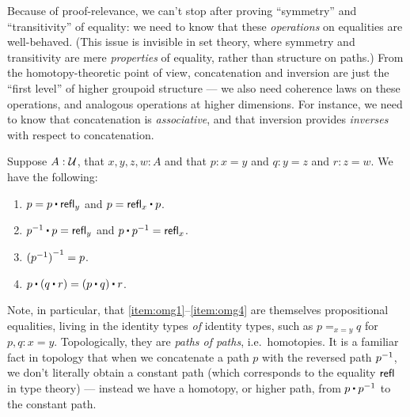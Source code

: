 Because of proof-relevance, we can't stop after proving ``symmetry'' and ``transitivity'' of equality: we need to know that these \emph{operations} on equalities are well-behaved.
(This issue is invisible in set theory, where symmetry and transitivity are mere \emph{properties} of equality, rather than structure on
paths.)
From the homotopy-theoretic point of view, concatenation and inversion are just the ``first level'' of higher groupoid structure --- we also need coherence laws on these operations, and analogous operations at higher dimensions.
For instance, we need to know that concatenation is \emph{associative}, and that inversion provides \emph{inverses} with respect to concatenation.

\begin{lem}\label{thm:omg}%
  Suppose $A:\mathcal{U}$, that $x,y,z,w:A$ and that $p:x= y$ and $q:y = z$ and $r:z=w$.
  We have the following:
  \begin{enumerate}
  \item $p= p\ct \refl{y}$ and $p = \refl{x} \ct p$.\label{item:omg1}
  \item $\opp{p}\ct p=  \refl{y}$ and $p\ct \opp{p}= \refl{x}$.
  \item $\mathord{{(\mathord{{p}^{-1}})}^{-1}}= p$.
  \item $p\ct (q\ct r)=  (p\ct q)\ct r$.\label{item:omg4}
  \end{enumerate}
\end{lem}

Note, in particular, that \ref{item:omg1}--\ref{item:omg4} are themselves propositional equalities, living in the identity types \emph{of} identity types, such as $p=_{x=y}q$ for $p,q:x=y$.
Topologically, they are \emph{paths of paths}, i.e.\ homotopies.
It is a familiar fact in topology that when we concatenate a path $p$ with the reversed path $\mathord{{p}^{-1}}$, we don't literally obtain a constant path (which corresponds to the equality $\mathsf{refl}_{}$ in type theory) --- instead we have a homotopy, or higher path, from $p\ct\opp p$ to the constant path.

